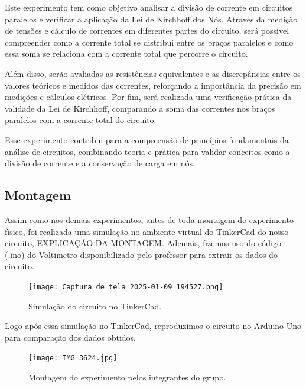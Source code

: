 \documentclass[a4paper,12pt]{article}
\begin{document}
Este experimento tem como objetivo analisar a divisão de corrente em circuitos paralelos e verificar a aplicação da Lei de Kirchhoff dos Nós. Através da medição de tensões e cálculo de correntes em diferentes partes do circuito, será possível compreender como a corrente total se distribui entre os braços paralelos e como essa soma se relaciona com a corrente total que percorre o circuito.

Além disso, serão avaliadas as resistências equivalentes e as discrepâncias entre os valores teóricos e medidos das correntes, reforçando a importância da precisão em medições e cálculos elétricos. Por fim, será realizada uma verificação prática da validade da Lei de Kirchhoff, comparando a soma das correntes nos braços paralelos com a corrente total do circuito. 

Esse experimento contribui para a compreensão de princípios fundamentais da análise de circuitos, combinando teoria e prática para validar conceitos como a divisão de corrente e a conservação de carga em nós.

\subsection{Montagem}
\leavevmode

Assim como nos demais experimentos, antes de toda montagem do experimento físico, foi realizada uma simulação no ambiente virtual do TinkerCad do nosso circuito, EXPLICAÇÃO DA MONTAGEM. Ademais, fizemos uso do código (.ino) do Voltimetro disponibilizado pelo professor para extrair os dados do circuito.

\vspace{1em}

\begin{figure}[H]
    \centering
    \texttt{[image: Captura de tela 2025-01-09 194527.png]} %
    \caption{Simulação do circuito no TinkerCad.}
    \label{fig:tinkercad}
\end{figure}

\vspace{1em}

Logo após essa simulação no TinkerCad, reproduzimos o circuito no Arduino Uno para comparação dos dados obtidos.

\vspace{1em}

\begin{figure}[H]
    \centering
    \texttt{[image: IMG\_3624.jpg]} %
    \caption{Montagem do experimento pelos integrantes do grupo.}
    \label{fig:arduino}
\end{figure}
\end{document}
